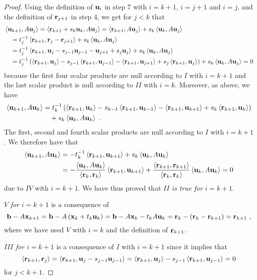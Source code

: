 \begin{proof}
Using the definition of $\mathbf{u}_i$ in step $7$ with $i=k+1$, $i=j+1$
and $i=j$, and the definition of $\mathbf{r}_{j+1}$ in step $4$, we get
for $j<k$ that
\begin{align*}
&\left\langle{\mathbf{u}_{k+1}} , {A\mathbf{u}_j}\right\rangle
= \left\langle{\mathbf{r}_{k+1} + s_k\mathbf{u}_k} , {A\mathbf{u}_j}\right\rangle
= \left\langle{\mathbf{r}_{k+1}} , {A\mathbf{u}_j}\right\rangle + s_k \left\langle{\mathbf{u}_k} , {A\mathbf{u}_j}\right\rangle \\
&\quad = t_j^{-1}\left\langle{\mathbf{r}_{k+1}} , {\mathbf{r}_j - \mathbf{r}_{j+1}}\right\rangle +
s_k \left\langle{\mathbf{u}_k} , {A\mathbf{u}_j}\right\rangle \\
&\quad = t_j^{-1} \left\langle{\mathbf{r}_{k+1}} , {\mathbf{u}_j - s_{j-1}\mathbf{u}_{j-1}
- \mathbf{u}_{j+1} + s_j \mathbf{u}_j}\right\rangle + s_k \left\langle{\mathbf{u}_k} , {A\mathbf{u}_j}\right\rangle \\
&\quad = t_j^{-1} \left( \left\langle{\mathbf{r}_{k+1}} , {\mathbf{u}_j}\right\rangle
- s_{j-1}\left\langle{\mathbf{r}_{k+1}} , {\mathbf{u}_{j-1}}\right\rangle
- \left\langle{\mathbf{r}_{k+1}} , {\mathbf{u}_{j+1}}\right\rangle
+ s_j \left\langle{\mathbf{r}_{k+1}} , {\mathbf{u}_j}\right\rangle\right)
+ s_k \left\langle{\mathbf{u}_k} , {A\mathbf{u}_j}\right\rangle
= 0
\end{align*}
because the first four scalar products are null according to $I$ with
$i=k+1$ and the last scalar product is null according to $II$ with
$i=k$.  Moreover, as above, we have
\begin{align*}
\left\langle{\mathbf{u}_{k+1}} , {A\mathbf{u}_k}\right\rangle
&= t_k^{-1} \left( \left\langle{\mathbf{r}_{k+1}} , {\mathbf{u}_k}\right\rangle
- s_{k-1}\left\langle{\mathbf{r}_{k+1}} , {\mathbf{u}_{k-1}}\right\rangle
- \left\langle{\mathbf{r}_{k+1}} , {\mathbf{u}_{k+1}}\right\rangle + s_k \left\langle{\mathbf{r}_{k+1}} , {\mathbf{u}_k}\right\rangle\right)\\
&\quad + s_k \left\langle{\mathbf{u}_k} , {A\mathbf{u}_k}\right\rangle \ .
\end{align*}
The first, second and fourth scalar products are null according to $I$
with $i=k+1$.  We therefore have that
\begin{align*}
\left\langle{\mathbf{u}_{k+1}} , {A\mathbf{u}_k}\right\rangle
&= - t_k^{-1} \left\langle{\mathbf{r}_{k+1}} , {\mathbf{u}_{k+1}}\right\rangle
+ s_k \left\langle{\mathbf{u}_k} , {A\mathbf{u}_k}\right\rangle \\
&= -\frac{\left\langle{\mathbf{u}_k} , {A\mathbf{u}_k}\right\rangle}{\left\langle{\mathbf{r}_k} , {\mathbf{r}_k}\right\rangle}
\left\langle{\mathbf{r}_{k+1}} , {\mathbf{u}_{k+1}}\right\rangle
+\frac{\left\langle{\mathbf{r}_{k+1}} , {\mathbf{r}_{k+1}}\right\rangle}{\left\langle{\mathbf{r}_k} , {\mathbf{r}_k}\right\rangle}
\left\langle{\mathbf{u}_k} , {A\mathbf{u}_k}\right\rangle
=0
\end{align*}
due to $IV$ with $i=k+1$.  We have thus proved that
{\em $II$ is true for $i=k+1$}.

{\em $V$ for $i=k+1$} is a consequence of
\[
\mathbf{b}-A\mathbf{x}_{k+1} = \mathbf{b}-A\left(\mathbf{x}_k+t_k\mathbf{u}_k\right)
= \mathbf{b}- A\mathbf{x}_k - t_k A\mathbf{u}_k
= \mathbf{r}_k - \left(\mathbf{r}_k - \mathbf{r}_{k+1}\right)
= \mathbf{r}_{k+1} \ ,
\]
where we have used $V$ with $i=k$ and the definition of $\mathbf{r}_{k+1}$.

{\em $III$ for $i=k+1$} is a consequence of $I$ with $i=k+1$ since
it implies that
\[
\left\langle{\mathbf{r}_{k+1}} , {\mathbf{r}_j}\right\rangle 
= \left\langle{\mathbf{r}_{k+1}} , {\mathbf{u}_j - s_{j-1}\mathbf{u}_{j-1}}\right\rangle 
= \left\langle{\mathbf{r}_{k+1}} , {\mathbf{u}_j}\right\rangle - s_{j-1}\left\langle{\mathbf{r}_{k+1}} , {\mathbf{u}_{j-1}}\right\rangle 
= 0
\]
for $j<k+1$.


\end{proof}

